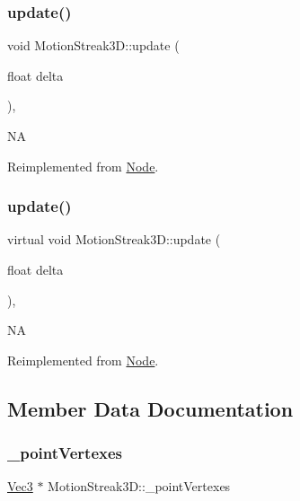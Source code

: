 \subsubsection{\texorpdfstring{update()}{update()}\hspace{0.1cm}{\footnotesize\ttfamily [1/2]}}
{\footnotesize\ttfamily void Motion\+Streak3\+D\+::update (\begin{DoxyParamCaption}\item[{float}]{delta }\end{DoxyParamCaption})\hspace{0.3cm}{\ttfamily [override]}, {\ttfamily [virtual]}}

NA 

Reimplemented from \hyperlink{classNode_a32878481ba54b3856ab53c10af13848e}{Node}.

\mbox{\label{classMotionStreak3D_a3d336bcb41bd598ba73389378b278382}} 
\subsubsection{\texorpdfstring{update()}{update()}\hspace{0.1cm}{\footnotesize\ttfamily [2/2]}}
{\footnotesize\ttfamily virtual void Motion\+Streak3\+D\+::update (\begin{DoxyParamCaption}\item[{float}]{delta }\end{DoxyParamCaption})\hspace{0.3cm}{\ttfamily [override]}, {\ttfamily [virtual]}}

NA 

Reimplemented from \hyperlink{classNode_a32878481ba54b3856ab53c10af13848e}{Node}.



\subsection{Member Data Documentation}
\mbox{\label{classMotionStreak3D_ad06a526af1362cc3f9c4e4da850e4b9d}} 
\subsubsection{\texorpdfstring{\+\_\+point\+Vertexes}{\_pointVertexes}}
{\footnotesize\ttfamily \hyperlink{classVec3}{Vec3} $\ast$ Motion\+Streak3\+D\+::\+\_\+point\+Vertexes\hspace{0.3cm}{\ttfamily [protected]}}

